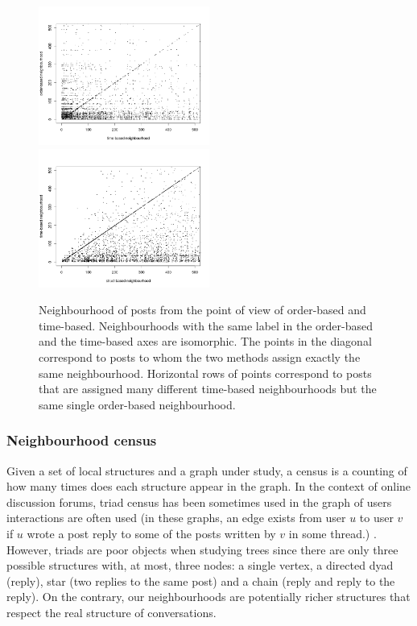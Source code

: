 \documentclass[conference]{IEEEtran}
\begin{document}
\begin{figure}
\centering
\includegraphics[width=0.5\textwidth]{confusion_time_order}%
\includegraphics[width=0.5\textwidth]{confusion_struct_time}
\caption{Neighbourhood of posts from the point of view of order-based and time-based. Neighbourhoods with the same label in the order-based and the time-based axes are isomorphic. The points in the diagonal correspond to posts to whom the two methods assign exactly the same neighbourhood. Horizontal rows of points correspond to posts that are assigned many different time-based neighbourhoods but the same single order-based neighbourhood.}
\label{fig:confusion}
\end{figure}

\subsubsection{Neighbourhood census}
Given a set of local structures and a graph under study, a census is a counting of how many times does each structure appear in the graph. In the context of online discussion forums, triad census has been sometimes used in the graph of users interactions are often used (in these graphs, an edge exists from user $u$ to user $v$ if $u$ wrote a post reply to some of the posts written by $v$ in some thread.) \cite{Adamic2008, Lumbreras2013}. However, triads are poor objects when studying trees since there are only three possible structures with, at most, three nodes: a single vertex, a directed dyad (reply), star (two replies to the same post) and a chain (reply and reply to the reply). On the contrary, our neighbourhoods are potentially richer structures that respect the real structure of conversations.
\end{document}
